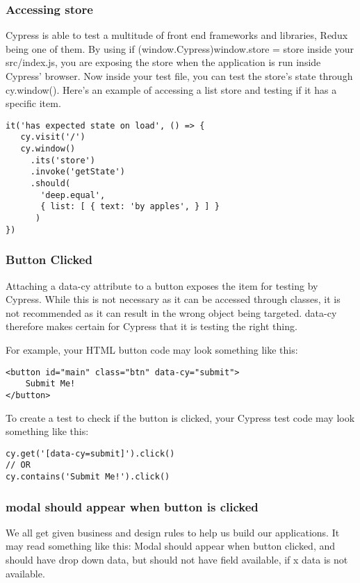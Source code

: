 \subsubsection{ Accessing store }
Cypress is able to test a multitude of front end frameworks and libraries,
Redux being one of them. By using if (window.Cypress){window.store = store }
inside your src/index.js, you are exposing the store when the application is
run inside Cypress' browser. Now inside your test file, you can test the store's
state through cy.window(). Here's an example of accessing a list store and
testing if it has a specific item.

\begin{lstlisting}
it('has expected state on load', () => {
   cy.visit('/')
   cy.window()
     .its('store')
     .invoke('getState')
     .should(
       'deep.equal',
       { list: [ { text: 'by apples', } ] }
      )
})
\end{lstlisting}

\subsubsection{ Button Clicked }
Attaching a data-cy attribute to a button exposes the item for testing by
Cypress. While this is not necessary as it can be accessed through classes, it
is not recommended as it can result in the wrong object being targeted. data-cy
therefore makes certain for Cypress that it is testing the right thing.

For example, your HTML button code may look something like this:

\begin{verbatim}
<button id="main" class="btn" data-cy="submit">
    Submit Me!
</button>
\end{verbatim}

To create a test to check if the button is clicked, your Cypress test code may
look something like this:

\begin{verbatim}
cy.get('[data-cy=submit]').click()
// OR
cy.contains('Submit Me!').click()
\end{verbatim}

\subsubsection{ modal should appear when button is clicked }
We all get given business and design rules to help us build our applications.
It may read something like this:
Modal should appear when button clicked, and should have drop down data, but
should not have field available, if x data is not available.

